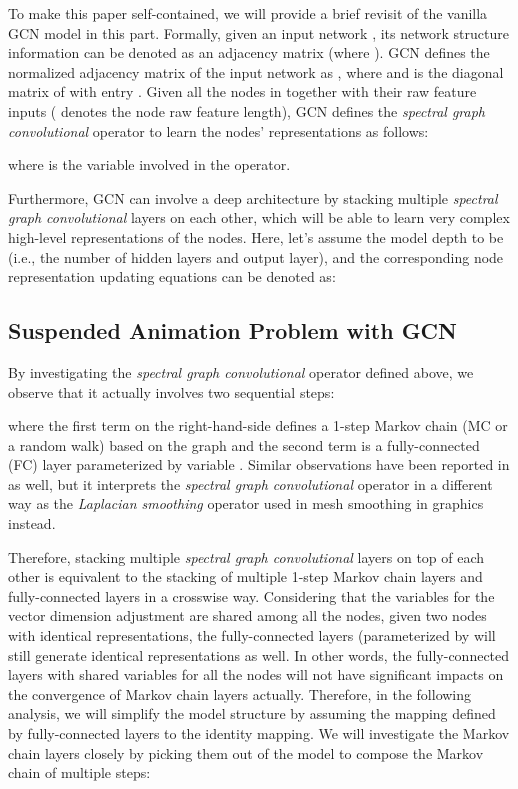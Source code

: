 \documentclass{article}
\newcommand{\gcn}{\textsc{GCN}}
\begin{document}
To make this paper self-contained, we will provide a brief revisit of the vanilla {\gcn} model in this part. Formally, given an input network , its network structure information can be denoted as an adjacency matrix  (where ). {\gcn} defines the normalized adjacency matrix of the input network as , where  and  is the diagonal matrix of  with entry . Given all the nodes in  together with their raw feature inputs  ( denotes the node raw feature length), {\gcn} defines the \textit{spectral graph convolutional} operator to learn the nodes' representations as follows:

where  is the variable involved in the operator.

Furthermore, {\gcn} can involve a deep architecture by stacking multiple \textit{spectral graph convolutional} layers on each other, which will be able to learn very complex high-level representations of the nodes. Here, let's assume the model depth to be  (i.e., the number of hidden layers and output layer), and the corresponding node representation updating equations can be denoted as:


\vspace{-8pt}
\subsection{Suspended Animation Problem with {\gcn}}
\vspace{-8pt}

By investigating the \textit{spectral graph convolutional} operator defined above, we observe that it actually involves two sequential steps:

where the first term on the right-hand-side defines a 1-step Markov chain (MC or a random walk) based on the graph and the second term is a fully-connected (FC) layer parameterized by variable . Similar observations have been reported in \cite{LHW18} as well, but it interprets the \textit{spectral graph convolutional} operator in a different way as the \textit{Laplacian smoothing} operator used in mesh smoothing in graphics instead.

Therefore, stacking multiple \textit{spectral graph convolutional} layers on top of each other is equivalent to the stacking of multiple 1-step Markov chain layers and fully-connected layers in a crosswise way. Considering that the variables  for the vector dimension adjustment are shared among all the nodes, given two nodes with identical representations, the fully-connected layers (parameterized by  will still generate identical representations as well. In other words, the fully-connected layers with shared variables for all the nodes will not have significant impacts on the convergence of Markov chain layers actually. Therefore, in the following analysis, we will simplify the model structure by assuming the mapping defined by fully-connected layers to the identity mapping. We will investigate the Markov chain layers closely by picking them out of the model to compose the Markov chain of multiple steps:
\end{document}
